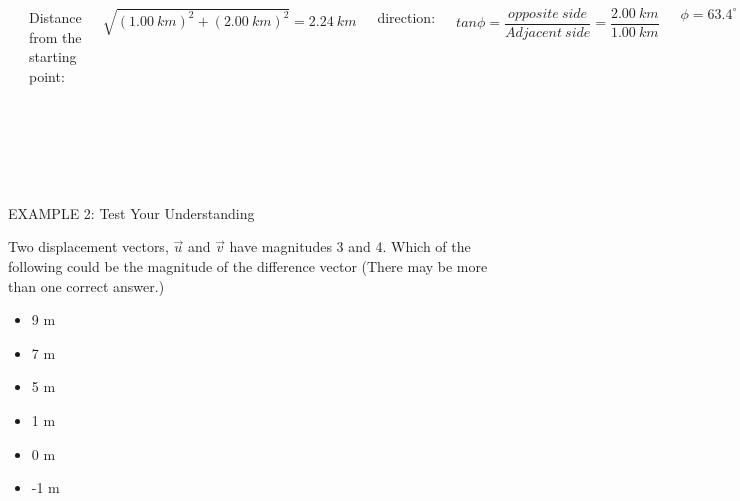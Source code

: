 \documentclass[]{beamer}
\begin{document}
\begin{frame}



  \begin{columns}[c]
   \column{2in}  %

   \begin{center}
      \includegraphics[height=1.7in]{images/perp_vec.jpg}
    \end{center}
    


  
   \column{2.7in}

 

Distance from the starting point:
\pause

\begin{equation*}
\sqrt{(1.00~km)^2+(2.00~km)^2}=2.24~km
\end{equation*}

\vspace{3 mm}

\pause

direction:

\pause

\begin{equation*}
tan \phi =\frac{opposite~side}{Adjacent~side}=\frac{2.00~km}{1.00~km}
\end{equation*}
\pause


\begin{equation*}
 \phi =63.4^{\circ}
\end{equation*}


   \end{columns}





\end{frame}



\begin{frame}
EXAMPLE 2: Test Your Understanding 
\vspace{3 mm}

Two displacement vectors, $\vec{u}$ and $\vec{v}$ have magnitudes 3 and 4. Which of the following could
be the magnitude of the difference vector (There may be more than one correct answer.)
\vspace{3 mm}

\begin{itemize}
\item  9 m
\item 7 m
\item  5 m
\item 1 m
\item 0 m
\item -1 m
 \end{itemize}
\end{frame}
\end{document}
